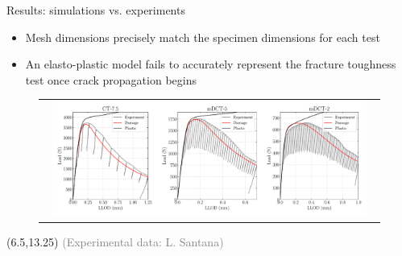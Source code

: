 \documentclass[9pt]{beamer}
\begin{document}

\begin{frame}{Results: simulations vs. experiments}

    \begin{itemize}
        \item Mesh dimensions precisely match the specimen dimensions for each test
        \vspace{0.15cm}
        \item An elasto-plastic model fails to accurately represent the fracture toughness test once crack propagation begins
        
    \end{itemize}

\begin{figure}
        \begin{tabular}{c}
            \includegraphics[width=0.95\textwidth]{Images/F_Load_X52.pdf} \\
        \end{tabular}
    \end{figure}
    
    \begin{textblock}{6}(6.5,13.25)
        \textcolor{gray}{\scriptsize (Experimental data: L. Santana)}
    \end{textblock}

\end{frame}  

\end{document}
